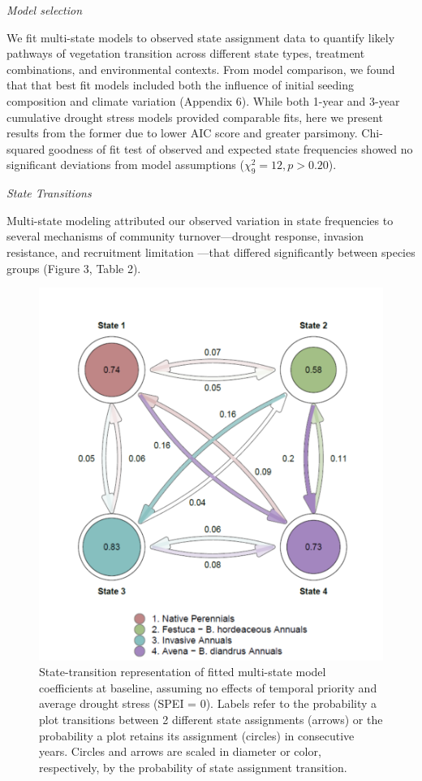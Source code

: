 \documentclass[twoside,12pt,final]{ucthesis-CA2012}
\begin{document}
\begin{ucmainmatter}
\emph{Model selection}

We fit multi-state models to observed state assignment data to quantify likely pathways of vegetation transition across different state types, treatment combinations, and environmental contexts.
From model comparison, we found that that best fit models included both the influence of initial seeding composition and climate variation (Appendix 6).
While both 1-year and 3-year cumulative drought stress models provided comparable fits, here we present results from the former due to lower AIC score and greater parsimony.
Chi-squared goodness of fit test of observed and expected state frequencies showed no significant deviations from model assumptions (\(\chi_9^2 = 12, p > 0.20\)).

\emph{State Transitions}

Multi-state modeling attributed our observed variation in state frequencies to several mechanisms of community turnover---drought response, invasion resistance, and recruitment limitation ---that differed significantly between species groups (Figure 3, Table 2).
\begin{figure}
\centering
\includegraphics[width=1\textwidth,height=0.8\textheight]{figure/Fig3_3.png}
\caption{State-transition representation of fitted multi-state model coefficients at baseline, assuming no effects of temporal priority and average drought stress (SPEI = 0). Labels refer to the probability a plot transitions between 2 different state assignments (arrows) or the probability a plot retains its assignment (circles) in consecutive years. Circles and arrows are scaled in diameter or color, respectively, by the probability of state assignment transition. \label{fig-3-3}}

\end{figure}
\end{ucmainmatter}
\end{document}
